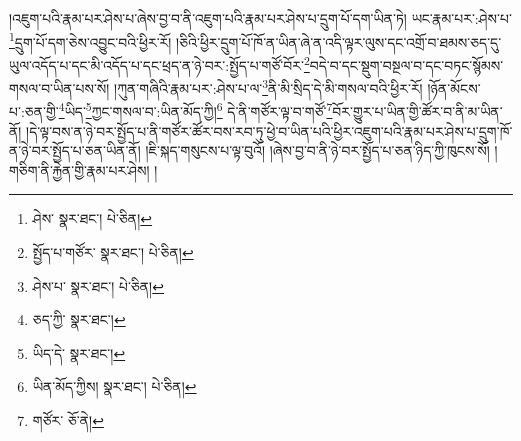།འཇུག་པའི་རྣམ་པར་ཤེས་པ་ཞེས་བྱ་བ་ནི་འཇུག་པའི་རྣམ་པར་ཤེས་པ་དྲུག་པོ་དག་ཡིན་ཏེ། ཡང་རྣམ་པར་:ཤེས་པ་\footnote{ཤེས་  སྣར་ཐང་།  པེ་ཅིན། }དྲུག་པོ་དག་ཅེས་འབྱུང་བའི་ཕྱིར་རོ། །ཅིའི་ཕྱིར་དྲུག་པོ་ཁོ་ན་ཡིན་ཞེ་ན་འདི་ལྟར་ལུས་དང་འགྲོ་བ་ཐམས་ཅད་དུ་ཡུལ་འདོད་པ་དང་མི་འདོད་པ་དང་ཕྲད་ན་ཉེ་བར་:སྤྱོད་པ་གཙོ་བོར་\footnote{སྤྱོད་པ་གཙོར་  སྣར་ཐང་།  པེ་ཅིན། }བདེ་བ་དང་སྡུག་བསྔལ་བ་དང་བཏང་སྙོམས་གསལ་བ་ཡིན་པས་སོ། །ཀུན་གཞིའི་རྣམ་པར་:ཤེས་པ་ལ་\footnote{ཤེས་པ་  སྣར་ཐང་།  པེ་ཅིན། }ནི་མི་སྲིད་དེ་མི་གསལ་བའི་ཕྱིར་རོ། །ཉོན་མོངས་པ་:ཅན་གྱི་\footnote{ཅད་ཀྱི་  སྣར་ཐང་། }ཡིད་\footnote{ཡིད་དེ་  སྣར་ཐང་། }ཀྱང་གསལ་བ་:ཡིན་མོད་ཀྱི།\footnote{ཡིན་མོད་ཀྱིས།  སྣར་ཐང་།  པེ་ཅིན། } དེ་ནི་གཙོར་ལྟ་བ་གཙོ་\footnote{གཙོར་  ཅོ་ནེ། }བོར་གྱུར་པ་ཡིན་གྱི་ཚོར་བ་ནི་མ་ཡིན་ནོ། །དེ་ལྟ་བས་ན་ཉེ་བར་སྤྱོད་པ་ནི་གཙོར་ཚོར་བས་རབ་ཏུ་ཕྱེ་བ་ཡིན་པའི་ཕྱིར་འཇུག་པའི་རྣམ་པར་ཤེས་པ་དྲུག་ཁོ་ན་ཉེ་བར་སྤྱོད་པ་ཅན་ཡིན་ནོ། །ཇི་སྐད་གསུངས་པ་ལྟ་བུའོ། །ཞེས་བྱ་བ་ནི་ཉེ་བར་སྤྱོད་པ་ཅན་ཉིད་ཀྱི་ཁུངས་སོ། །གཅིག་ནི་རྐྱེན་གྱི་རྣམ་པར་ཤེས། །
